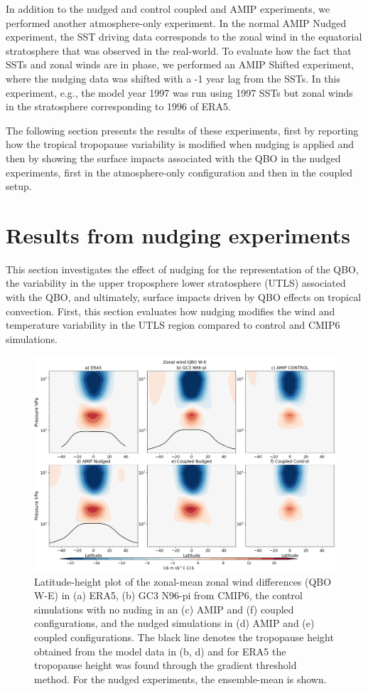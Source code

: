 In addition to the nudged and control coupled and AMIP experiments, we performed another atmosphere-only experiment. In the normal AMIP Nudged experiment, the SST driving data corresponds to the zonal wind in the equatorial stratosphere that was observed in the real-world. To evaluate how the fact that SSTs and zonal winds are in phase, we performed an AMIP Shifted experiment, where the nudging data was shifted with a -1 year lag from the SSTs. In this experiment, e.g., the model year 1997 was run using 1997 SSTs but zonal winds in the stratosphere corresponding to 1996 of ERA5. 

The following section presents the results of these experiments, first by reporting how the tropical tropopause variability is modified when nudging is applied and then by showing the surface impacts associated with the QBO in the nudged experiments, first in the atmosphere-only configuration and then in the coupled setup.

\section{ Results from nudging experiments}

This section investigates the effect of nudging for the representation of the QBO, the variability in the upper troposphere lower stratosphere (UTLS) associated with the QBO, and ultimately, surface impacts driven by QBO effects on tropical convection. 
First, this section evaluates how nudging modifies the wind and temperature variability in the UTLS region compared to control and CMIP6 simulations.  

\begin{figure}[b!]
\centering
 \includegraphics[width=\linewidth]{figures/zonalplotx_wind.png}
\caption[Zonal mean zonal wind QBO difference]{Latitude-height plot of the zonal-mean zonal wind differences (QBO W-E) in (a) ERA5, (b) GC3 N96-pi from CMIP6, the control simulations with no nuding in an (c) AMIP and (f) coupled configurations, and the nudged simulations in (d) AMIP and (e) coupled configurations. The black line denotes the tropopause height obtained from the model data in (b, d) and for ERA5 the tropopause height was found through the gradient threshold method. For the nudged experiments, the ensemble-mean is shown. }
\label{fig:zonal_u}
\end{figure}


